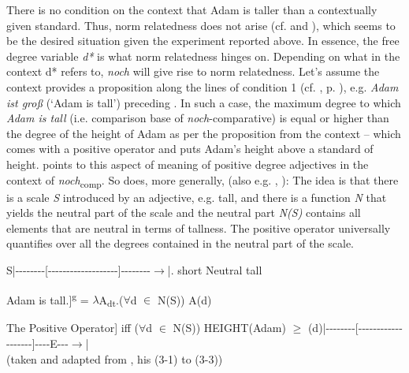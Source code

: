 \documentclass[output=paper,
modfonts
]{langscibook}
\begin{document}
\noindent There is no condition on the context that Adam is taller than a contextually given standard. Thus, norm relatedness does not arise (cf. \citealt{umbach2009a_comp} and ), which seems to be the desired situation given the experiment reported above. In essence, the free degree variable \textit{d*} is what norm relatedness hinges on. Depending on what in the context d* refers to, \textit{noch} will give rise to norm relatedness. Let's assume the context provides a proposition along the lines of condition 1 (cf. , p. \pageref{tab:4_conds}), e.g. \textit{Adam ist groß} (`Adam is tall') preceding . In such a case, the maximum degree to which \textit{Adam is tall} (i.e. comparison base of \textit{noch}-comparative) is equal or higher than the degree of the height of Adam as per the proposition from the context -- which comes with a positive operator and puts Adam's height above a standard of height. \citeauthor{umbach2009a_comp} \citeyearpar{umbach2009a_comp} points to this aspect of meaning of positive degree adjectives in the context of \textit{noch}\textsubscript{comp}. So does, more generally, \citeauthor{stechow2006} \citeyearpar{stechow2006}(also e.g. \citep{stechow1984}, \citep{Beck2011}): The idea is that there is a scale \textit{S} introduced by an adjective, e.g. tall, and there is a function \textit{N} that yields the neutral part of the scale and the neutral part \textit{N(S)} contains all elements that are neutral in terms of tallness. The positive operator universally quantifies over all the degrees contained in the neutral part of the scale. \citep{stechow2006}

\ea S\hspace{15pt}|{-}{-}{-}{-}{-}{-}{-}{-}{[}{-}{-}{-}{-}{-}{-}{-}{-}{-}{-}{-}{-}{-}{-}{-}{-}{-}{-}{-}{]}{-}{-}{-}{-}{-}{-}{-}{-}$\to$|\newline .\hspace{22pt} short \hspace{20pt} Neutral \hspace{25pt} tall\z

\ea Adam is tall.\newline [[\textbf{Pos}\textsubscript{N,S}]]\textsuperscript{g} = $\lambda$A\textsubscript{dt}.(\textbf{$\forall$}d $\in$ N(S)) A(d) \z

\ea The Positive Operator\newline [[\textbf{Pos}\textsubscript{N,S}$\lambda$d.tall\textsubscript{S}(d)(Adam)]] iff ($\forall$d $\in$ N(S)) HEIGHT(Adam) $\geq$ (d)\newline|{-}{-}{-}{-}{-}{-}{-}{-}{[}{-}{-}{-}{-}{-}{-}{-}{-}{-}{-}{-}{-}{-}{-}{-}{-}{-}{-}{-}{]}{-}{-}{-}{-}{E}{-}{-}{-}$\to$| \\ (taken and adapted from \citeauthor{stechow2006} \citeyearpar{stechow2006}, his (3-1) to (3-3))\z
\end{document}
